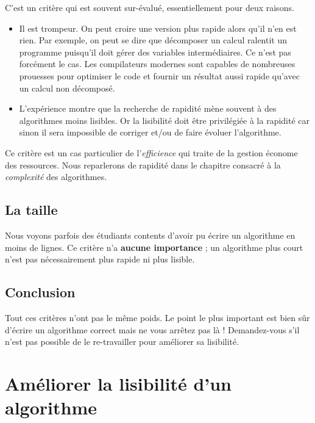 			C'est un critère qui est souvent sur-évalué, 
			essentiellement pour deux raisons.
			\begin{itemize}
				\item 
					Il est trompeur. 
					On peut croire une version plus rapide alors qu'il n'en est rien.
					Par exemple, on peut se dire que décomposer un calcul
					ralentit un programme puisqu'il doit gérer des variables
					intermédiaires.
					Ce n'est pas forcément le cas.
					Les compilateurs modernes sont capables
					de nombreuses prouesses pour optimiser le code
					et fournir un résultat aussi rapide
					qu'avec un calcul non décomposé.
				\item
					L'expérience montre que la recherche de rapidité
					mène souvent à des algorithmes moins lisibles.
					Or la lisibilité doit être privilégiée à la rapidité
					car sinon il sera impossible de corriger et/ou
					de faire évoluer l'algorithme.
			\end{itemize}
		
			Ce critère est un cas particulier de l'\emph{efficience}
			qui traite de la gestion économe des ressources.
			Nous reparlerons de rapidité
			dans le chapitre consacré à la \emph{complexité}
			des algorithmes.
		
		\subsection{La taille}
		
			Nous voyons parfois des étudiants contents d'avoir
			pu écrire un algorithme en moins de lignes.
			Ce critère n'a \textbf{aucune importance} ;
			un algorithme plus court n'est pas nécessairement
			plus rapide ni plus lisible.
		
		\subsection{Conclusion}
			
			Tout ces critères n'ont pas le même poids.
			Le point le plus important est bien sûr d'écrire
			un algorithme correct mais ne vous arrêtez pas là !
			Demandez-vous s'il n'est pas possible de le re-travailler
			pour améliorer sa lisibilité.
		
	\section{Améliorer la lisibilité d'un algorithme}\label{lisibilite}
		
